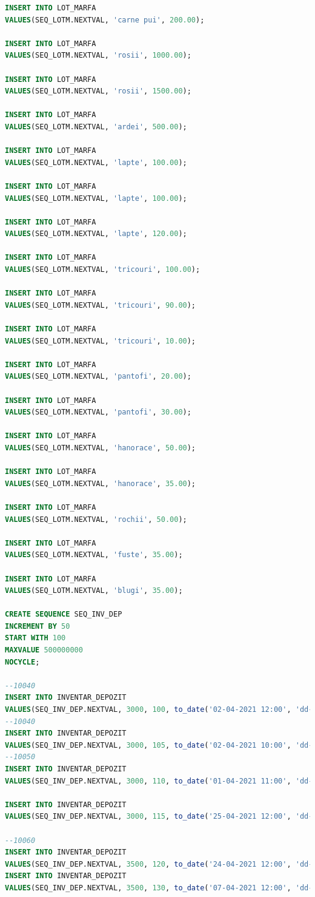 \documentclass[12pt, a4paper]{article}
\begin{document}
\begin{lstlisting}[language=SQL]
INSERT INTO LOT_MARFA
VALUES(SEQ_LOTM.NEXTVAL, 'carne pui', 200.00);

INSERT INTO LOT_MARFA
VALUES(SEQ_LOTM.NEXTVAL, 'rosii', 1000.00);

INSERT INTO LOT_MARFA
VALUES(SEQ_LOTM.NEXTVAL, 'rosii', 1500.00);

INSERT INTO LOT_MARFA
VALUES(SEQ_LOTM.NEXTVAL, 'ardei', 500.00);

INSERT INTO LOT_MARFA
VALUES(SEQ_LOTM.NEXTVAL, 'lapte', 100.00);

INSERT INTO LOT_MARFA
VALUES(SEQ_LOTM.NEXTVAL, 'lapte', 100.00);

INSERT INTO LOT_MARFA
VALUES(SEQ_LOTM.NEXTVAL, 'lapte', 120.00);

INSERT INTO LOT_MARFA
VALUES(SEQ_LOTM.NEXTVAL, 'tricouri', 100.00);

INSERT INTO LOT_MARFA
VALUES(SEQ_LOTM.NEXTVAL, 'tricouri', 90.00);

INSERT INTO LOT_MARFA
VALUES(SEQ_LOTM.NEXTVAL, 'tricouri', 10.00);

INSERT INTO LOT_MARFA
VALUES(SEQ_LOTM.NEXTVAL, 'pantofi', 20.00);

INSERT INTO LOT_MARFA
VALUES(SEQ_LOTM.NEXTVAL, 'pantofi', 30.00);

INSERT INTO LOT_MARFA
VALUES(SEQ_LOTM.NEXTVAL, 'hanorace', 50.00);

INSERT INTO LOT_MARFA
VALUES(SEQ_LOTM.NEXTVAL, 'hanorace', 35.00);

INSERT INTO LOT_MARFA
VALUES(SEQ_LOTM.NEXTVAL, 'rochii', 50.00);

INSERT INTO LOT_MARFA
VALUES(SEQ_LOTM.NEXTVAL, 'fuste', 35.00);

INSERT INTO LOT_MARFA
VALUES(SEQ_LOTM.NEXTVAL, 'blugi', 35.00);

CREATE SEQUENCE SEQ_INV_DEP
INCREMENT BY 50
START WITH 100
MAXVALUE 500000000
NOCYCLE;

--10040
INSERT INTO INVENTAR_DEPOZIT
VALUES(SEQ_INV_DEP.NEXTVAL, 3000, 100, to_date('02-04-2021 12:00', 'dd-mm-yyyy hh24:mi'), null);
--10040
INSERT INTO INVENTAR_DEPOZIT
VALUES(SEQ_INV_DEP.NEXTVAL, 3000, 105, to_date('02-04-2021 10:00', 'dd-mm-yyyy hh24:mi'), null);
--10050
INSERT INTO INVENTAR_DEPOZIT
VALUES(SEQ_INV_DEP.NEXTVAL, 3000, 110, to_date('01-04-2021 11:00', 'dd-mm-yyyy hh24:mi'), null);

INSERT INTO INVENTAR_DEPOZIT
VALUES(SEQ_INV_DEP.NEXTVAL, 3000, 115, to_date('25-04-2021 12:00', 'dd-mm-yyyy hh24:mi'), null);

--10060
INSERT INTO INVENTAR_DEPOZIT
VALUES(SEQ_INV_DEP.NEXTVAL, 3500, 120, to_date('24-04-2021 12:00', 'dd-mm-yyyy hh24:mi'), null);
INSERT INTO INVENTAR_DEPOZIT
VALUES(SEQ_INV_DEP.NEXTVAL, 3500, 130, to_date('07-04-2021 12:00', 'dd-mm-yyyy hh24:mi'), null);


\end{lstlisting}
\end{document}
